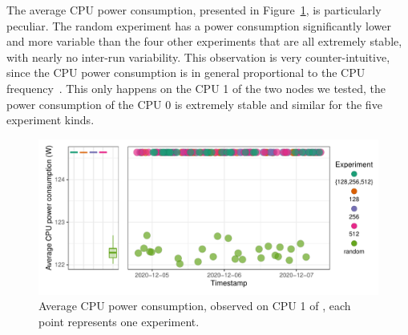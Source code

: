             The average CPU power consumption, presented in
            Figure~\ref{fig:randomizing_sizes:expfile:fixing_K:power_CPU}, is particularly peculiar. The random
            experiment has a power consumption significantly lower and more variable than the four other experiments
            that are all extremely stable, with nearly no inter-run variability. This observation is very
            counter-intuitive, since the CPU power consumption is in general proportional to the CPU
            frequency~\cite{heinrich:hal-01523608}.  This only happens on the CPU 1 of the two nodes we tested, the
            power consumption of the CPU 0 is extremely stable and similar for the five experiment kinds.

            \begin{figure}[htpb]
                \centering
                \includegraphics[width=1\linewidth]{img/experiment/randomizing_sizes/fixing_K/average_power_CPU.pdf}
                \caption{Average CPU power consumption, observed on CPU 1 of \dahu[5], each point represents one experiment.}%
                \label{fig:randomizing_sizes:expfile:fixing_K:power_CPU}
            \end{figure}

